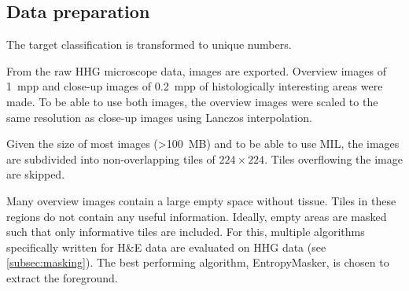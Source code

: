 \subsection{Data preparation}

The target classification is transformed to unique numbers.

From the raw HHG microscope data, images are exported.
Overview images of \qty{1}{mpp} and close-up images of \qty{0.2}{mpp} of histologically interesting areas were made.
To be able to use both images, the overview images were scaled to the same resolution as close-up images using Lanczos interpolation.

Given the size of most images (\qty{>100}{MB}) and to be able to use MIL, the images are subdivided into non-overlapping tiles of $224 \times 224$.
Tiles overflowing the image are skipped.

Many overview images contain a large empty space without tissue.
Tiles in these regions do not contain any useful information.
Ideally, empty areas are masked such that only informative tiles are included.
For this, multiple algorithms specifically written for H\&E data are evaluated on HHG data (see \cref{subsec:masking}).
The best performing algorithm, EntropyMasker, is chosen to extract the foreground.
